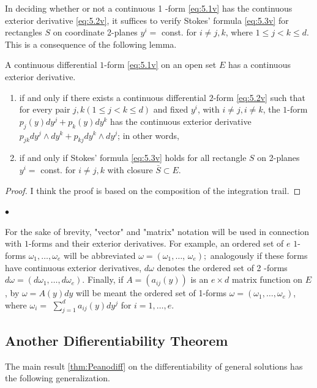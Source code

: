 \documentclass{article}
\begin{document}
In deciding whether or not a continuous 1 -form \cref{eq:5.1v} has the continuous exterior derivative \cref{eq:5.2v}, it suffices to verify Stokes' formula \cref{eq:5.3v} for rectangles $S$ on coordinate 2-planes $y^{i}=$ const. for $i \neq j, k$, where $1 \le j<k \le d$. This is a consequence of the following lemma.
\begin{lema}
A continuous differential $1$-form \cref{eq:5.1v} on an open set $E$ has a continuous exterior derivative.
\begin{enumerate}
    \item if and only if there exists a continuous differential $2$-form \cref{eq:5.2v} such that for every pair $j, k(1 \le j<k \le d)$ and fixed $y^{i}$, with $i \neq j, i \neq k$, the $1$-form $p_{j}(y) d y^{j}+p_{k}(y) d y^{k}$ has the continuous exterior derivative $p_{j k} d y^{j} \wedge d y^{k}+p_{k j} d y^{k} \wedge d y^{j}$; in other words, 
    \item if and only if Stokes' formula \cref{eq:5.3v} holds for all rectangle $S$ on 2-planes $y^{i}=$ const. for $i \neq j, k$ with closure $\bar{S} \subset E$.
\end{enumerate}
\end{lema}
\begin{proof}
I think the proof is based on the composition of the integration trail.
\end{proof}

$\bullet$  

For the sake of brevity, "vector" and "matrix" notation will be used in connection with $1$-forms and their exterior derivatives. For example, an ordered set of $e$ $1$-forms $\omega_{1}, \ldots, \omega_{e}$ will be abbreviated $\omega=\left(\omega_{1}, \ldots\right.$, $\left.\omega_{e}\right) ;$ analogously if these forms have continuous exterior derivatives, $d \omega$ denotes the ordered set of 2 -forms $d \omega=\left(d \omega_{1}, \ldots, d \omega_{e}\right)$. Finally, if $A=\left(a_{i j}(y)\right)$ is an $e \times d$ matrix function on $E$, by $\omega=A(y) d y$ will be meant the ordered set of 1-forms $\omega=\left(\omega_{1}, \ldots, \omega_{e}\right)$, where $\omega_{i}=$ $\sum_{j=1}^{d} a_{i j}(y) d y^{j}$ for $i=1, \ldots, e$.

\subsection{Another Difierentiability Theorem}
The main result \cref{thm:Peanodiff} on the differentiability of general solutions has the following generalization.
\end{document}

